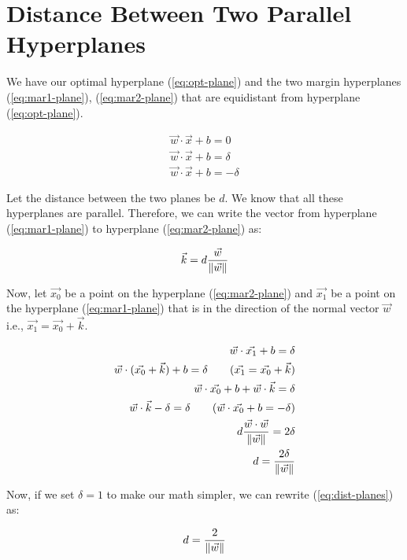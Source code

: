 \section{Distance Between Two Parallel Hyperplanes}

We have our optimal hyperplane (\ref{eq:opt-plane}) and the two margin hyperplanes (\ref{eq:mar1-plane}), (\ref{eq:mar2-plane}) that are equidistant from hyperplane (\ref{eq:opt-plane}).

\begin{align}
	\vec{w}\cdot\vec{x} + b = 0 \label{eq:opt-plane} \\
	\vec{w}\cdot\vec{x} + b = \delta \label{eq:mar1-plane} \\
	\vec{w}\cdot\vec{x} + b = -\delta \label{eq:mar2-plane}
\end{align}

Let the distance between the two planes be $d$. We know that all these hyperplanes are parallel. Therefore, we can write the vector from hyperplane (\ref{eq:mar1-plane}) to hyperplane (\ref{eq:mar2-plane}) as:

\begin{equation}
	\vec{k} = d\frac{\vec{w}}{\left\lVert\vec{w}\right\rVert}
\end{equation}

Now, let $\vec{x_0}$ be a point on the hyperplane (\ref{eq:mar2-plane}) and $\vec{x_1}$ be a point on the hyperplane (\ref{eq:mar1-plane}) that is in the direction of the normal vector $\vec{w}$ i.e., $\vec{x_1} = \vec{x_0} + \vec{k}$.

\begin{align}
	\vec{w}\cdot\vec{x_1} + b = \delta \nonumber\\
	\vec{w}\cdot(\vec{x_0} + \vec{k}) + b = \delta \tag*{($\vec{x_1} = \vec{x_0} + \vec{k}$)}\nonumber\\
	\vec{w}\cdot\vec{x_0} + b + \vec{w}\cdot\vec{k} = \delta \nonumber\\
	\vec{w}\cdot\vec{k} - \delta = \delta \tag*{($\vec{w}\cdot\vec{x_0} + b = -\delta$)}\nonumber\\
	d\frac{\vec{w}\cdot\vec{w}}{\norm{\vec{w}}} = 2\delta \nonumber\\
	d = \frac{2\delta}{\norm{\vec{w}}} \label{eq:dist-planes}
\end{align}

Now, if we set $\delta = 1$ to make our math simpler, we can rewrite (\ref{eq:dist-planes}) as:

\begin{equation}
	d = \frac{2}{\left\lVert\vec{w}\right\rVert} \nonumber
\end{equation}

